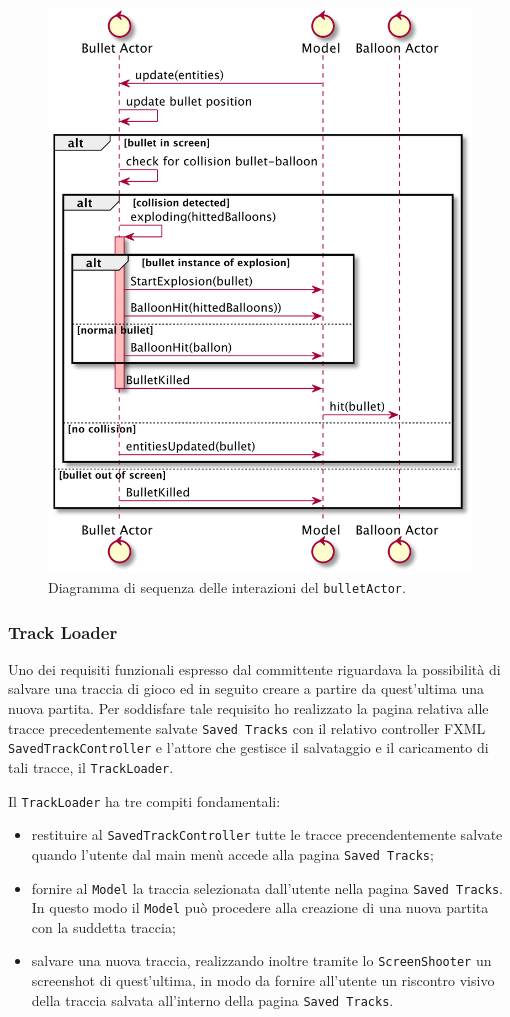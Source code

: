 \begin{figure}[H]
    \centering
    \includegraphics[width=.7\linewidth]{img/sequence-bullet-actor}
    \caption{Diagramma di sequenza delle interazioni del \texttt{bulletActor}.}
    \label{fig:sequence-bullet-actor}
\end{figure}

\subsubsection{Track Loader}\label{subsec:track-loader}
Uno dei requisiti funzionali espresso dal committente riguardava la possibilità di salvare una traccia di gioco ed in seguito
creare a partire da quest'ultima una nuova partita. Per soddisfare tale requisito ho realizzato la pagina relativa alle
tracce precedentemente salvate \texttt{Saved Tracks} con il relativo controller FXML \texttt{SavedTrackController} e l'attore che gestisce il salvataggio
e il caricamento di tali tracce, il \texttt{TrackLoader}.

Il \texttt{TrackLoader} ha tre compiti fondamentali:
\begin{itemize}
    \item restituire al \texttt{SavedTrackController} tutte le tracce precendentemente salvate quando l'utente
    dal main menù accede alla pagina \texttt{Saved Tracks};
    \item fornire al \texttt{Model} la traccia selezionata dall'utente nella pagina \texttt{Saved Tracks}.
    In questo modo il \texttt{Model} può procedere alla creazione di una nuova partita con la suddetta traccia;
    \item salvare una nuova traccia, realizzando inoltre tramite lo \texttt{ScreenShooter} un screenshot di quest'ultima,
    in modo da fornire all'utente un riscontro visivo della traccia salvata all'interno della pagina \texttt{Saved Tracks}.
\end{itemize}

